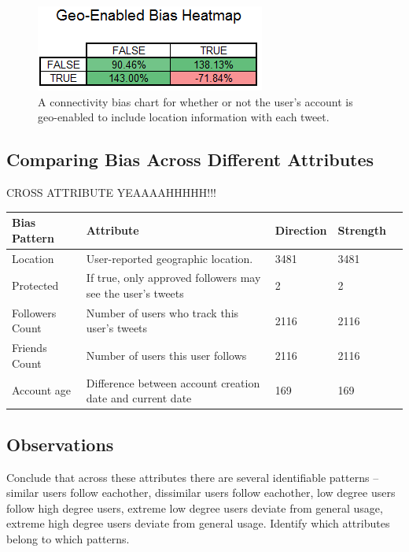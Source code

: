 \begin{figure}[t]
 \centering
 \includegraphics[bb=0 0 214 80, scale=.5]{./images/geoenabled.png}
 \caption{A connectivity bias chart for whether or not the user's account is geo-enabled to include location information with each tweet.}
 \label{fig:geoenabled}
\end{figure}

\subsection{Comparing Bias Across Different Attributes}
\label{sub:crossattribute}
CROSS ATTRIBUTE YEAAAAHHHHH!!!

\noindent \begin{tabular}[t]{| p{1in} | p{1.75in} | p{1in} | p{1in} | p{1.25in} |}
\hline
\textbf{Bias Pattern} & \textbf{Attribute} & \textbf{Direction} & \textbf{Strength}  \\ \hline
Location & User-reported geographic location. & 3481 & 3481  \\ \hline
Protected & If true, only approved followers may see the user's tweets & 2 & 2  \\ \hline
Followers Count & Number of users who track this user's tweets & 2116 & 2116 \\ \hline
Friends Count & Number of users this user follows & 2116 & 2116 \\ \hline
Account age & Difference between account creation date and current date & 169 & 169  \\ \hline
\end{tabular}


\subsection{Observations}
Conclude that across these attributes there are several identifiable patterns -- similar users follow eachother, dissimilar users follow eachother, low degree users follow high degree users, extreme low degree users deviate from general usage, extreme high degree users deviate from general usage.  Identify which attributes belong to which patterns.\\


